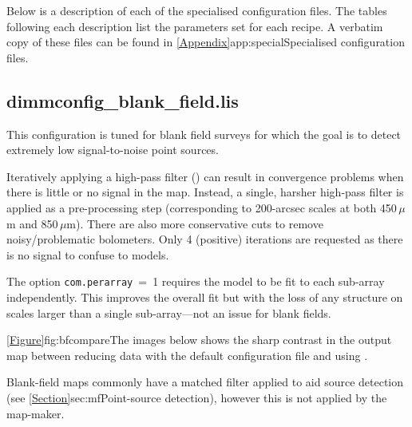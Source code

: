 \documentclass[11pt,oneside,chapters]{starlink}
\begin{document}
Below is a description of each of the specialised configuration files.
The tables following each description list the parameters set for each
recipe. A verbatim copy of these files can be found in
\cref{Appendix}{app:special}{Specialised configuration files}.

\subsection{dimmconfig\_blank\_field.lis}
\begin{latexonly}
This configuration is tuned for blank field surveys for which the goal
is to detect extremely low signal-to-noise point sources.

Iteratively applying a high-pass
filter () can result in convergence problems when there is
little or no signal in the map. Instead, a single, harsher high-pass
filter is applied as a pre-processing step (corresponding to
200-arcsec scales at both 450\,$\mu$m and 850\,$\mu$m). There are also
more conservative cuts to remove noisy/problematic bolometers. Only 4
(positive) iterations are requested as there is no signal to confuse
to models.

The option \texttt{com.perarray}~=~1 requires the  model to
be fit to each sub-array independently. This improves the overall fit
but with the loss of any structure on scales larger than a single
sub-array---not an issue for blank fields.

\cref{Figure}{fig:bfcompare}{The images below} shows the sharp
contrast in the output map between reducing data with the default
configuration file and using .

Blank-field maps commonly have a matched filter applied to aid source
detection (see \cref{Section}{sec:mf}{Point-source detection}),
however this is not applied by the map-maker.
\vspace{0.3cm}


\end{latexonly}
\end{document}
